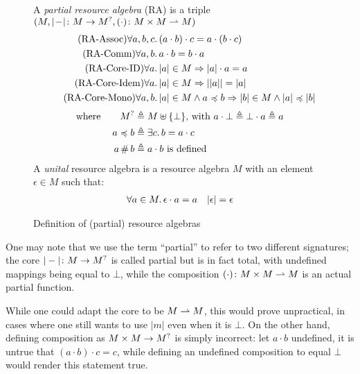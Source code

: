 \begin{figure}
A \emph{partial resource algebra} (RA) is a triple $(M, |\!-\!|\colon M\rightarrow M^?, (\cdot)\colon M\times M \rightharpoonup M)$
\begin{align}
	\tag{RA-Assoc} \forall a,b,c&\ldotp (a\cdot b)\cdot c = a\cdot (b\cdot c)\\
	\tag{RA-Comm} \forall a,b&\ldotp a\cdot b = b\cdot a\\
	\tag{RA-Core-ID} \forall a&\ldotp |a| \in M \Rightarrow |a|\cdot a = a\\
	\tag{RA-Core-Idem} \forall a&\ldotp |a|\in M\Rightarrow ||a|| = |a|\\
	\tag{RA-Core-Mono} \forall a,b&\ldotp |a|\in M\land a\preccurlyeq b \Rightarrow |b| \in M \land |a| \preccurlyeq |b|
\end{align}
\begin{align*}
	\text{where}\qquad
	M^? &\triangleq M \uplus \{\bot\}\text{, with }a\cdot \bot \triangleq \bot\cdot a\triangleq a\\
	a \preccurlyeq b &\triangleq \exists c\ldotp b = a\cdot c\\
	a\operatorname{\#} b &\triangleq a \cdot b \text{ is defined}
\end{align*}
A \emph{unital} resource algebra is a resource algebra $M$ with an element $\epsilon\in M$ such that:
\begin{align*}
	\forall a\in M\ldotp \epsilon\cdot a = a&&
	|\epsilon|=\epsilon
\end{align*}
\caption{Definition of (partial) resource algebras}
\label{fig:ra-properties}
\end{figure}

\begin{remark}
	One may note that we use the term ``partial'' to refer to two different signatures; the core $|-|\colon M \rightarrow M^?$ is called partial but is in fact total, with undefined mappings being equal to $\bot$, while the composition $(\cdot)\colon M\times M\rightharpoonup M$ is an actual partial function.

	While one could adapt the core to be $M\rightharpoonup M$, this would prove unpractical, in cases where one still wants to use $|m|$ even when it is $\bot$. On the other hand, defining composition as $M\times M\rightarrow M^?$ is simply incorrect: let $a\cdot b$ undefined, it is untrue that $(a\cdot b)\cdot c=c$, while defining an undefined composition to equal $\bot$ would render this statement true.
\end{remark}

